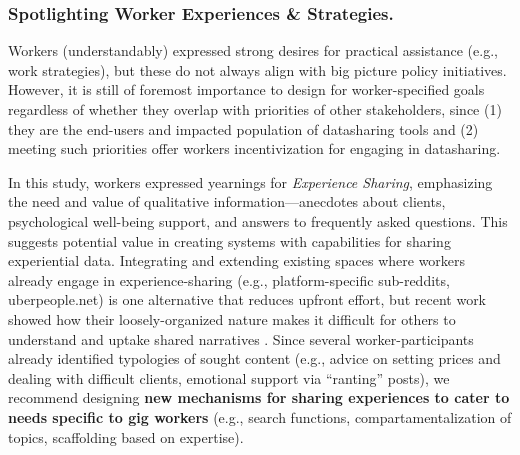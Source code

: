 \subsubsection{{\textbf{Spotlighting Worker Experiences \& Strategies.}}}
{Workers (understandably) expressed strong desires for practical assistance (e.g., work strategies), but these do not always align with big picture policy initiatives. 
However, it is still of foremost importance to design for worker-specified goals regardless of whether they overlap with priorities of other stakeholders, since (1) they are the end-users and impacted population of datasharing tools and (2) meeting such priorities offer workers incentivization for engaging in datasharing. 

In this study, workers expressed yearnings for \textit{Experience Sharing}, emphasizing the need and value of qualitative information---anecdotes about clients, psychological well-being support, and answers to frequently asked questions. %
%
This suggests potential value in creating systems with capabilities for sharing experiential data. Integrating and extending existing spaces where workers already engage in experience-sharing (e.g., platform-specific sub-reddits, uberpeople.net) \cite{ERsM, woodcock2019gig} is one alternative that reduces upfront effort, but recent work showed how their loosely-organized nature makes it difficult for others to understand and uptake shared narratives \cite{peersupport}. 
Since several worker-participants already identified typologies of sought content (e.g., advice on setting prices and dealing with difficult clients, emotional support via ``ranting'' posts), we recommend designing \textbf{new mechanisms for sharing experiences to cater to needs specific to gig workers} (e.g., search functions, compartamentalization of topics, scaffolding based on expertise).}


